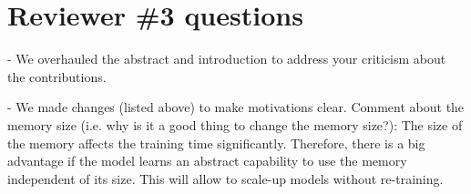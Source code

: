 \documentclass[10pt,twocolumn,letterpaper]{article}
\begin{document}
\section{Reviewer \#3 questions}
 - We overhauled the abstract and  introduction to address your criticism about the contributions.
 
 - We made changes (listed above) to make motivations clear.
Comment about the memory size (i.e. why is it a good thing to change the memory size?): The size of the memory affects the training time significantly. Therefore, there is a big advantage if the model learns an abstract capability to use the memory independent of its size.  This will allow to scale-up models without re-training.
% 
% 
\end{document}
